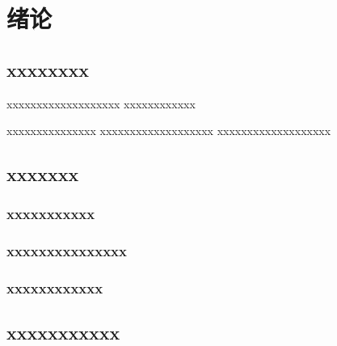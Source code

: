 
\chapter{绪\quad 论}
\section{xxxxxxxx}
xxxxxxxxxxxxxxxxxxx
xxxxxxxxxxxx

xxxxxxxxxxxxxxx
xxxxxxxxxxxxxxxxxxx
xxxxxxxxxxxxxxxxxxx

\section{xxxxxxx}
\subsection{xxxxxxxxxxx}

\subsection{xxxxxxxxxxxxxxx}

\subsection{xxxxxxxxxxxx}

\section{xxxxxxxxxxx}
